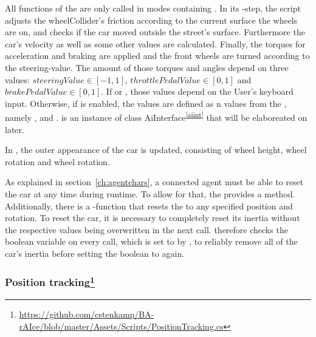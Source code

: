 All functions of the  are only called in modes containing . In its -step, the script adjusts the wheelCollider's friction according to the current surface the wheels are on, and checks if the car moved outside the street's surface. Furthermore the car's velocity as well as some other values are calculated. Finally, the torques for acceleration and braking are applied and the front wheels are turned according to the steering-value. The amount of those torques and angles depend on three values: $steeringValue \in [-1,1]$, $throttlePedalValue \in [0,1]$ and $brakePedalValue \in [0,1]$. If  or , those values depend on the User's keyboard input. Otherwise, if  is enabled, the values are defined as n values from the , namely ,  and .  is an instance of class AiInterface\textsuperscript{\ref{aiint}} that will be elaboreated on later.

In , the outer appearance of the car is updated, consisting of wheel height, wheel rotation and wheel rotation.

As explained in section~\ref{ch:agentchars}, a connected agent must be able to reset the car at any time during runtime. To allow for that, the  provides a  method. Additionally, there is a -function that resets the  to any specified position and rotation. To reset the car, it is necessary to completely reset its inertia without the respective values being overwritten in the next  call.  therefore checks the boolean variable  on every call, which is set to  by , to reliably remove all of the car's inertia before setting the boolean to  again.



\subsubsection{Position tracking\footnote{\url{https://github.com/cstenkamp/BA-rAIce/blob/master/Assets/Scripts/PositionTracking.cs}}}

